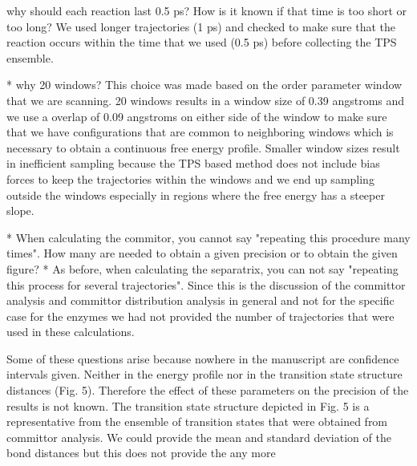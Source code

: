 \documentclass[journal=jpcbfk,manuscript=article,layout=traditional]{achemso}
\begin{document}
\begin{response}
  {why should each reaction last 0.5 ps? How is it known if that time is too short 
  or too long?}
We used longer trajectories (1 ps) and checked to make sure that the reaction occurs within
the time that we used (0.5 ps) before collecting the TPS ensemble. 

\end{response}

{\begin{response}
{* why 20 windows?}
This choice was made based on the order parameter window that we are scanning.
20 windows results in a window size of 0.39 angstroms and we use a overlap of
0.09 angstroms on either side of the window to make sure that we have configurations
that are common to neighboring windows which is necessary to obtain a continuous free energy
profile. Smaller window sizes result in inefficient sampling because the TPS based method
does not include bias forces to keep the trajectories within the windows and we end up
sampling outside the windows especially in regions where the free energy has a steeper slope.  



\end{response}

\begin{response}
{* When calculating the commitor, you cannot say "repeating this procedure many times". 
How many are needed to obtain a given precision or to obtain the given figure?
\newline
* As before, when calculating the separatrix, you can not say "repeating this 
process for several trajectories".}
Since this is the discussion of the committor analysis and committor distribution 
analysis in general and not for the specific case for the enzymes we had not
provided the number of trajectories that were used in these calculations.

\end{response}

\begin{response}{Some of these questions arise because nowhere in 
the manuscript are confidence intervals given. Neither in the energy 
profile nor in the transition state structure distances (Fig. 5). 
Therefore the effect of these parameters on the precision of the 
results is not known.
}
The transition state structure depicted in Fig. 5 is a representative
from the ensemble of transition states that were obtained from committor
analysis. We could provide the mean and standard deviation of the bond distances
but this does not provide the any more 


\end{response}}
\end{document}
